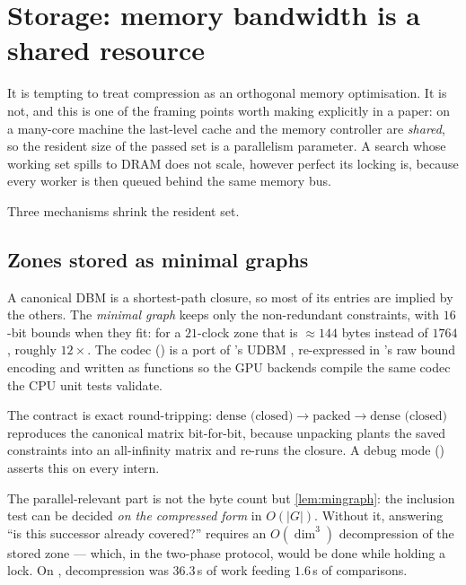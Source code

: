 \section{Storage: memory bandwidth is a shared resource}
\label{sec:storage}

It is tempting to treat compression as an orthogonal memory optimisation.  It
is not, and this is one of the framing points worth making explicitly in a
paper: on a many-core machine the last-level cache and the memory controller
are \emph{shared}, so the resident size of the passed set is a parallelism
parameter.  A search whose working set spills to DRAM does not scale, however
perfect its locking is, because every worker is then queued behind the same
memory bus.

Three mechanisms shrink the resident set.

\subsection{Zones stored as minimal graphs}

\FigMingraph

A canonical DBM is a shortest-path closure, so most of its entries are implied
by the others.  The \emph{minimal graph} keeps only the non-redundant
constraints, with $16$-bit bounds when they fit: for a $21$-clock zone that is
$\approx 144$ bytes instead of $1764$, roughly $12\times$.  The codec
() is a port of \uppaal{}'s UDBM
, re-expressed in \tool{}'s raw bound encoding and written as
 functions so the GPU backends compile the same
codec the CPU unit tests validate.

The contract is exact round-tripping:
$\text{dense (closed)} \to \text{packed} \to \text{dense (closed)}$ reproduces
the canonical matrix bit-for-bit, because unpacking plants the saved
constraints into an all-infinity matrix and re-runs the closure.  A debug mode
() asserts this on every intern.

The parallel-relevant part is not the byte count but \cref{lem:mingraph}: the
inclusion test can be decided \emph{on the compressed form} in $O(|G|)$.
Without it, answering ``is this successor already covered?'' requires an
$O(\dim^3)$ decompression of the stored zone --- which, in the two-phase
protocol, would be done while holding a lock.  On ,
decompression was $36.3$\,s of work feeding $1.6$\,s of comparisons.

